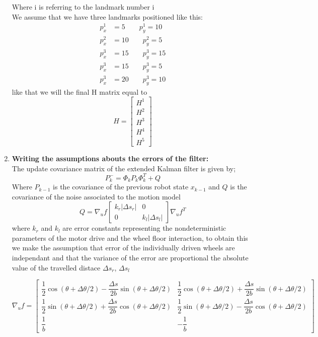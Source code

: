 \documentclass[11pt,a4paper]{report}
\begin{document}
\begin{enumerate}
Where i is referring to the landmark number i \\
We assume that we have three landmarks positioned  like this:
\begin{align*}
p_{x}^1 &= 5 \qquad p_{y}^1 = 10\\
p_{x}^2 &= 10 \qquad p_{y}^2 = 5\\
p_{x}^3 &= 15 \qquad p_{y}^3 = 15\\
p_{x}^3 &= 15 \qquad p_{y}^3 = 5\\
p_{x}^3 &= 20 \qquad p_{y}^3 = 10
\end{align*}  
like that we will the final H matrix equal to 
$$ H =\left [ \begin{array}{ccc} H^1 \\H^2 \\H^3\\H^4\\H^5 \end{array}  \right] $$
 
\item\textbf{Writing the assumptions abouts the errors of the filter:}\\
The update covariance matrix of the extended Kalman filter is given by;
$$ P_{k}^- = \Phi_{k} P_{k} \Phi_{k}^T  + Q $$	
Where $P_{k-1}$ is the covariance of the previous robot state $x_{k-1}$ and $Q$ is the covariance of the noise associated to the motion model 
$$ Q = \nabla _{u}f \left [ \begin{array}{cc} k_{r}|\Delta s _{r}| & 0\\ 0 & k_{l} |\Delta s_{l}|\end{array} \right ] \nabla _{u}f^T $$
where $k_{r} $ and $k_{l}$ are error constants representing the nondeterministic parameters of the motor drive and the wheel floor interaction, to obtain this we make the assumption that error of the individually driven wheels are independant and that the variance of the error are proportional the absolute value of the travelled distace $\Delta s_{r} $, $\Delta s_{l}$
 
$$\nabla _{u} f = \left [\begin{array}{cc}  \dfrac{1}{2} \cos( \theta + \Delta \theta /2) - \dfrac{\Delta s}{2b}\sin(\theta + \Delta \theta /2) & \dfrac{1}{2} \cos( \theta + \Delta \theta /2) + \dfrac{\Delta s}{2b}\sin(\theta + \Delta \theta /2)\\
\dfrac{1}{2} \sin( \theta + \Delta \theta /2) + \dfrac{\Delta s}{2b}\cos(\theta + \Delta \theta /2) & \dfrac{1}{2} \sin( \theta + \Delta \theta /2) - \dfrac{\Delta s}{2b}\cos(\theta + \Delta \theta /2) \\
\dfrac{1}{b} & -\dfrac{1}{b} \end{array} \right] $$



\end{enumerate}
\end{document}
